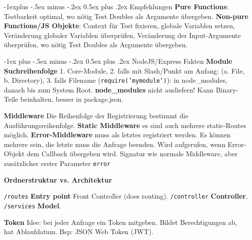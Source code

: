 \documentclass[a4paper, fontsize=6pt]{scrartcl}
\makeatletter
\renewcommand{\section}{\@startsection{section}{1}{0mm}%
    {-1ex plus -.5ex minus -.2ex}%
    {0.5ex plus .2ex}%
    {\normalfont\large\bfseries}}
\renewcommand{\subsection}{\@startsection{subsection}{2}{0mm}%
    {-1explus -.5ex minus -.2ex}%
    {0.5ex plus .2ex}%
    {\normalfont\normalsize\bfseries}}
\makeatother
\begin{document}
\begin{multicols*}{5}
\subsection{Empfehlungen}
\textbf{Pure Functions}: Testbarkeit optimal, wo nötig Test Doubles als Argumente übergeben. \textbf{Non-pure Functions/JS Objekte}: Context für Test fixieren, globale Variablen setzen, Veränderung globaler Variablen überprüfen, Veränderung der Input-Argumente überprüfen, wo nötig Test Doubles als Argumente übergeben.


\section{NodeJS/Express Fakten}
\textbf{Module}
\textbf{Suchreihenfolge} 1. Core-Module, 2. falls mit Slash/Punkt am Anfang: (a. File, b. Directory), 3. falls Filename (\texttt{require('mymodule')}): in node\_modules, danach bis zum System Root.    
\textbf{node\_modules} nicht ausliefern! Kann Binary-Teile beinhalten, besser in package.json.

\textbf{Middleware}
Die Reihenfolge der Registrierung bestimmt die Ausführungsreihenfolge.
\textbf{Static Middleware} es sind auch mehrere static-Routes möglich.
\textbf{Error-Middleware} muss als letztes registriert werden. Es können mehrere sein, die letzte muss die Anfrage beenden. Wird aufgerufen, wenn Error-Objekt dem Callback übergeben wird. Signatur wie normale Middleware, aber zusätzlicher erster Parameter \texttt{error}

\textbf{Ordnerstruktur vs. Architektur}

\texttt{/routes} \textbf{Entry point} Front Controller (does routing).
\texttt{/controller} \textbf{Controller}.
\texttt{/services} \textbf{Model}.

\textbf{Token} Idee: bei jeder Anfrage ein Token mitgeben. Bildet Berechtigungen ab, hat Ablaufdatum. Bsp: JSON Web Token (JWT).


\end{multicols*}
\end{document}
